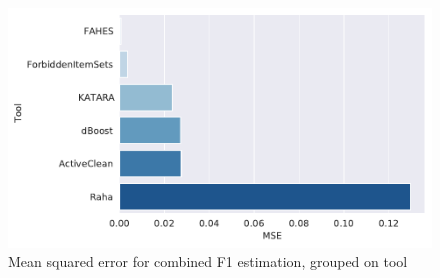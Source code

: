 \begin{figure}
    \centering
    \includegraphics[width=\textwidth]{thesis/Figures/RQ2/15_tools_combined_f1.pdf}
    \caption{Mean squared error for combined F1 estimation, grouped on tool}
    \label{fig:mse_combined_f1_tool}
\end{figure}